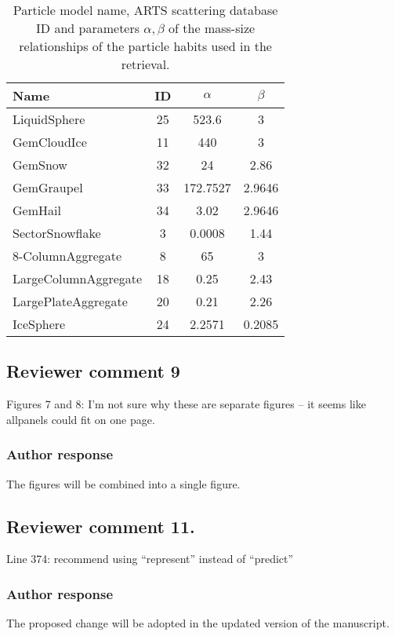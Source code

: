 \documentclass[11pt]{scrartcl}
\begin{document}
\begin{itemize}
\begin{table}
  \centering
  \caption{Particle model name, ARTS scattering database ID and parameters
    $\alpha, \beta$ of the mass-size relationships of the particle habits used
    in the retrieval.}
  \begin{tabular}{l|c|c|c}
    Name & ID & $\alpha$ & $\beta$ \\
    \hline
    LiquidSphere & 25  & 523.6    & 3 \\
    GemCloudIce  & 11  & 440      & 3 \\
    GemSnow      & 32  & 24       & 2.86 \\
    GemGraupel   & 33  & 172.7527 & 2.9646 \\
    GemHail      & 34  & 3.02     & 2.9646 \\
    \hline
    SectorSnowflake      &  3  & 0.0008 & 1.44 \\
    8-ColumnAggregate    &  8  & 65     & 3 \\
    LargeColumnAggregate &  18 & 0.25   & 2.43 \\
    LargePlateAggregate  &  20 & 0.21   & 2.26 \\
    IceSphere            &  24 & 2.2571 & 0.2085 \\
  \end{tabular}
  \label{tab:particle_properties}
\end{table}


\subsection*{Reviewer comment 9}

Figures 7 and 8:  I’m not sure why these are separate figures – it seems like allpanels could fit on one page.

\subsubsection*{Author response}

The figures will be combined into a single figure.

\subsection*{Reviewer comment 11.}
 Line 374: recommend using “represent” instead of “predict”

\subsubsection*{Author response}
The proposed change will be adopted in the updated version of the manuscript.


\end{itemize}
\end{document}

